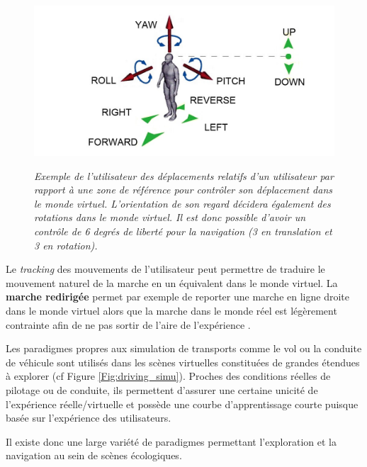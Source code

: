 \begin{figure}[h]
 \centering
 {\includegraphics[width=0.8\linewidth]{./figures/ch3/HCNav}}
   \caption[Technique de navigation HCNav.]{\it Exemple de l'utilisateur des déplacements relatifs d'un utilisateur par rapport à une zone de référence pour contrôler son déplacement dans le monde virtuel. L'orientation de son regard décidera également des rotations dans le monde virtuel. Il est donc possible d'avoir un contrôle de 6 degrés de liberté pour la navigation (3 en translation et 3 en rotation).}
   \label{Fig:HCNAV}
 \hspace{0.3cm}
\end{figure}

Le \textit{tracking} des mouvements de l'utilisateur peut permettre de traduire le mouvement naturel de la marche en un équivalent dans le monde virtuel. La \textbf{marche redirigée} permet par exemple de reporter une marche en ligne droite dans le monde virtuel alors que la marche dans le monde réel est légèrement contrainte afin de ne pas sortir de l'aire de l'expérience \cite{bruder_redirecting_2012}.

Les paradigmes propres aux simulation de transports comme le vol ou la conduite de véhicule sont utilisés dans les scènes virtuelles constituées de grandes étendues à explorer (cf Figure \ref{Fig:driving_simu}). Proches des conditions réelles de pilotage ou de conduite, ils permettent d'assurer une certaine unicité de l'expérience réelle/virtuelle et possède une courbe d'apprentissage courte puisque basée sur l'expérience des utilisateurs.

Il existe donc une large variété de paradigmes permettant l'exploration et la navigation au sein de scènes écologiques. 

